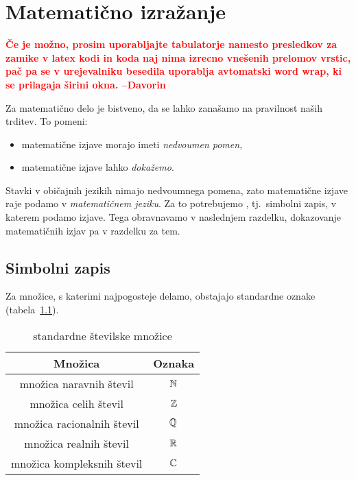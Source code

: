 \chapter{Matematično izražanje}\label{POGLAVJE: Matematično izražanje}

	
	\textcolor{red}{\small \textbf{Če je možno, prosim uporabljajte tabulatorje namesto presledkov za zamike v latex kodi in koda naj nima izrecno vnešenih prelomov vrstic, pač pa se v urejevalniku besedila uporablja avtomatski word wrap, ki se prilagaja širini okna. --Davorin}}
	
	Za matematično delo je bistveno, da se lahko zanašamo na pravilnost naših trditev. To pomeni:
	\begin{itemize}
		\item
			matematične izjave morajo imeti \emph{nedvoumen pomen},
		\item
			matematične izjave lahko \emph{dokažemo}.
	\end{itemize}
	
	Stavki v običajnih jezikih nimajo nedvoumnega pomena, zato matematične izjave raje podamo v \emph{matematičnem jeziku}. Za to potrebujemo , tj.~simbolni zapis, v katerem podamo izjave. Tega obravnavamo v naslednjem razdelku, dokazovanje matematičnih izjav pa v razdelku za tem.
	
	\section{Simbolni zapis}\label{RAZDELEK: Simbolni zapis}
	
		Za množice, s katerimi najpogosteje delamo, obstajajo standardne oznake (tabela~\ref{TABELA: standardne številske množice}).
		
		\begin{table}[!ht]
			\centering
			\begin{tabular}{|cc|}
				\hline
				\textbf{Množica} & \textbf{Oznaka} \\
				\hline
				množica naravnih števil & $\mathbb{N}$ \\
				množica celih števil & $\mathbb{Z}$ \\
				množica racionalnih števil & $\mathbb{Q}$ \\
				množica realnih števil & $\mathbb{R}$ \\
				množica kompleksnih števil & $\mathbb{C}$ \\
				\hline
			\end{tabular}
			\caption{standardne številske množice}\label{TABELA: standardne številske množice}
		\end{table}
		
